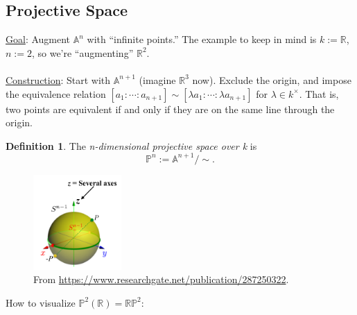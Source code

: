 \documentclass[12pt]{article}
\newcommand{\real}{\mathbb{R}}
\newcommand{\ita}[1]{\textit{#1}}
\theoremstyle{definition}
\newtheorem{definition}[theorem]{Definition}
\begin{document}
\subsection{Projective Space}
\underline{Goal}: Augment $\mathbb{A}^n$ with ``infinite points.'' The example to keep in mind is $k:=\real$, $n:=2$, so we're ``augmenting'' $\real^2$.\\\\
\underline{Construction}: Start with $\mathbb{A}^{n+1}$ (imagine $\real^3$ now). Exclude the origin, and impose the equivalence relation $[a_1:\cdots:a_{n+1}]\sim[\lambda a_1:\cdots:\lambda a_{n+1}]$ for $\lambda\in k^{\times}$. That is, two points are equivalent if and only if they are on the same line through the origin.
\begin{definition}
    The \ita{n-dimensional projective space over k} is 
    \begin{equation}
        \boxed{\mathbb{P}^n:=\mathbb{A}^{n+1}/\sim.}
    \end{equation}
\end{definition}
\begin{figure}[H]
        \centering
        \includegraphics[width=0.3\textwidth]{53.png}
        \caption{From \url{https://www.researchgate.net/publication/287250322}.}
    \end{figure}
How to visualize $\mathbb{P}^2(\real)=\real\mathbb{P}^2$:
\end{document}
